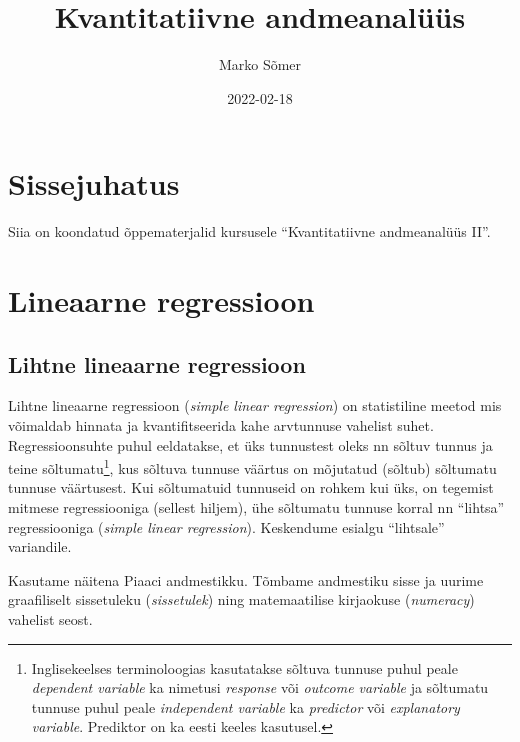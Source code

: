 \documentclass[
]{book}
\title{Kvantitatiivne andmeanalüüs}
\author{Marko Sõmer}
\date{2022-02-18}
\begin{document}
\maketitle

{
\setcounter{tocdepth}{1}
\tableofcontents
}
\hypertarget{sissejuhatus}{%
\chapter{Sissejuhatus}\label{sissejuhatus}}

Siia on koondatud õppematerjalid kursusele ``Kvantitatiivne andmeanalüüs II''.

\hypertarget{lineaarne-regressioon}{%
\chapter{Lineaarne regressioon}\label{lineaarne-regressioon}}

\hypertarget{lihtne-lineaarne-regressioon}{%
\section{Lihtne lineaarne regressioon}\label{lihtne-lineaarne-regressioon}}

Lihtne lineaarne regressioon (\emph{simple linear regression}) on statistiline meetod mis võimaldab hinnata ja kvantifitseerida kahe arvtunnuse vahelist suhet. Regressioonsuhte puhul eeldatakse, et üks tunnustest oleks nn sõltuv tunnus ja teine sõltumatu\footnote{Inglisekeelses terminoloogias kasutatakse sõltuva tunnuse puhul peale \emph{dependent variable} ka nimetusi \emph{response} või \emph{outcome variable} ja sõltumatu tunnuse puhul peale \emph{independent variable} ka \emph{predictor} või \emph{explanatory variable}. Prediktor on ka eesti keeles kasutusel.}, kus sõltuva tunnuse väärtus on mõjutatud (sõltub) sõltumatu tunnuse väärtusest. Kui sõltumatuid tunnuseid on rohkem kui üks, on tegemist mitmese regressiooniga (sellest hiljem), ühe sõltumatu tunnuse korral nn ``lihtsa'' regressiooniga (\emph{simple linear regression}). Keskendume esialgu ``lihtsale'' variandile.

Kasutame näitena Piaaci andmestikku. Tõmbame andmestiku sisse ja uurime graafiliselt sissetuleku (\emph{sissetulek}) ning matemaatilise kirjaokuse (\emph{numeracy}) vahelist seost.
\end{document}
